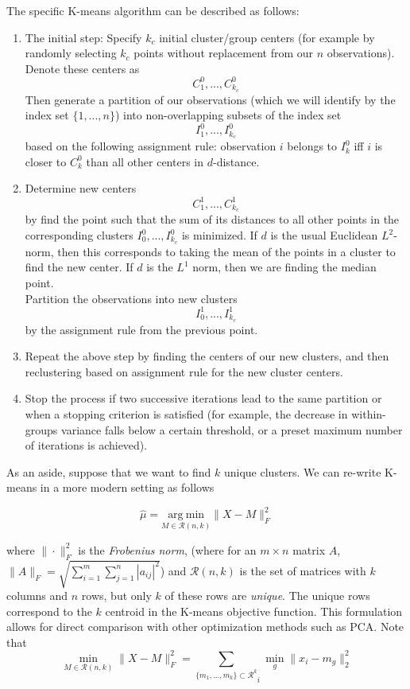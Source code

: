 The specific K-means algorithm can be described as follows:

\begin{enumerate}
\item The initial step: Specify $k_c$ initial cluster/group centers (for example by randomly selecting $k_c$ points without replacement from our $n$ observations).\\ Denote these centers as
$$C_1^0, ..., C_{k_c}^0$$
Then generate a partition of our observations (which we will identify by the index set $\{1, ..., n\}$) into non-overlapping subsets of the index set
$$I_1^0, ..., I_{k_c}^0$$
based on the following assignment rule: observation $i$ belongs to $I_k^0$ iff $i$ is closer to $C_k^0$ than all other centers in $d$-distance.
\item Determine new centers
$$C_1^1, ..., C_{k_c}^1$$
by find the point such that the sum of its distances to all other points in the corresponding clusters $I^0_0, ..., I^0_{k_c}$ is minimized. If $d$ is the usual Euclidean $L^2$-norm, then this corresponds to taking the mean of the points in a cluster to find the new center. If $d$ is the $L^1$ norm, then we are finding the median point.\\
Partition the observations into new clusters
$$I_0^1, ..., I_{k_c}^1$$
by the assignment rule from the previous point.
\item Repeat the above step by finding the centers of our new clusters, and then reclustering based on assignment rule for the new cluster centers.
\item Stop the process if two successive iterations lead to the same partition or when a stopping criterion is satisfied (for example, the decrease in within-groups variance falls below a certain threshold, or a preset maximum number of iterations is achieved).
\end{enumerate}







As an aside, suppose that we want to find $k$ unique clusters. We can re-write K-means in a more modern setting as follows

$$\hat{\mu} = \underset{M \in \mathcal{R}(n, k)}{\text{arg}~\text{min}} \| X - M\|_F^2$$

where $\| \cdot \|_F^2$ is the \emph{Frobenius norm}, (where for an $m \times n$ matrix $A$, $\|A\|_F = \sqrt{\sum_{i=1}^m \sum_{j=1}^n |a_{ij}|^2}$) and $\mathcal{R}(n, k)$ is the set of matrices with $k$ columns and $n$ rows, but only $k$ of these rows are \emph{unique}. The unique rows correspond to the $k$ centroid in the K-means objective function. This formulation allows for direct comparison with other optimization methods such as PCA. Note that
$$\underset{M \in \mathcal{R}(n,k)}{\min} \|X - M\|_F^2 = \underset{\{m_1, ..., m_k\} \subset \mathcal{R}^k} \sum_i \underset{g}{\min} \|x_i - m_g \|_2^2$$



